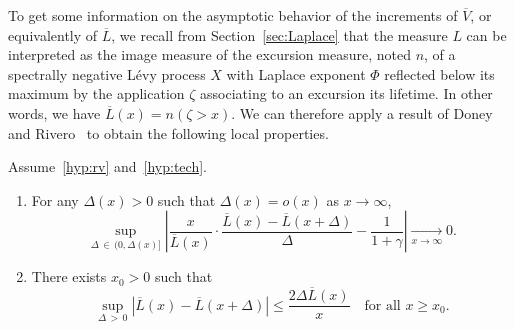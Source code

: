 \documentclass[AHL,Unicode,longabstracts,published]{cedram}
\renewcommand{\bar}[1]{\overline{#1}}
\newcommand*{\relabel}{\renewcommand{\labelenumi}{(\theenumi)}}
\newcommand*{\romanenumi}{\renewcommand*{\theenumi}{\roman{enumi}}\relabel}
\begin{document}
To get some information on the asymptotic behavior of the increments of $\bar V$, or equivalently of $\bar L$, we recall from Section~\ref{sec:Laplace} that the measure $L$ can be interpreted as the image measure of the excursion measure, noted $n$, of a spectrally negative Lévy process $X$ with Laplace exponent $\Phi$ reflected below its maximum by the application $\zeta$ associating to an excursion its lifetime. In other words, we have $\bar L(x)=n(\zeta>x)$. We can therefore apply a result of Doney and Rivero~\cite{DR13,DR16_err} to obtain the following local properties.

\begin{lemm}\label{lem:increments}
Assume~\eqref{hyp:rv} and~\eqref{hyp:tech}.
\begin{enumerate}\romanenumi
\item\label{lemm3.3.1} For any $\Delta(x)>0$ such that $\Delta(x)=o(x)$ as $x \rightarrow \infty$,
\[
\sup_{\Delta\,\in\,(0,\Delta(x)]} \left|\frac{x}{\bar L(x)} \cdot \frac{\bar L(x)-\bar L(x+\Delta)}{\Delta} - \frac{1}{1+\gamma}\right| \underset{x \rightarrow \infty}\rightarrow 0.
\]
\item\label{lemm3.3.2} There exists $x_0>0$ such that
\[
\sup_{\Delta\,>\,0} \left|\bar L(x)-\bar L(x+\Delta) \right| \leq \frac{2 \Delta \bar L(x)}{x} \quad \text{for all } x \geq x_0.
\]
\end{enumerate}
\end{lemm}
\end{document}
